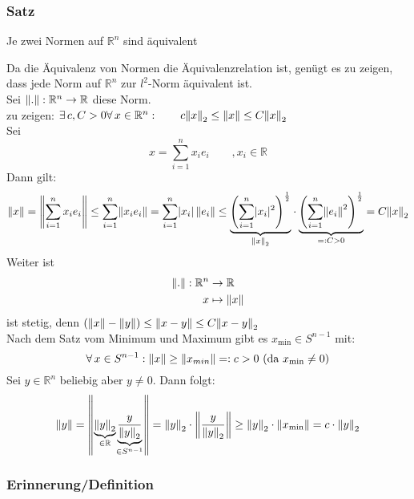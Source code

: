 \subsubsection{Satz} %
\label{ssub:satz}
Je zwei Normen auf $\mathbb{R}^n$ sind äquivalent

Da die Äquivalenz von Normen die Äquivalenzrelation ist, genügt es zu zeigen, dass jede Norm auf $\mathbb{R}^n$ zur $l^2$-Norm äquivalent ist. \\
Sei $\norm{.}:\mathbb{R}^n \to  \mathbb{R}$ diese Norm. \\
zu zeigen: $\exists\, c,C>0 \forall\, x \in \mathbb{R}^n: \qquad c \norm{x}_2 \leq \norm{x} \leq C \norm{x}_2$ \\
Sei \[
	x = \sum^{n}_{i=1}x_ie_i \qquad , x_i \in \mathbb{R}
\]
Dann gilt:
\[
	\norm{x}= \norm{\sum^{n}_{i=1}x_ie_i} \leq \sum^{n}_{i=1}\norm{x_ie_i} = \sum^{n}_{i=1}\abs{x_i} \, \norm{e_i} 
	\leq \underset{\norm{x}_2}{\underbrace{\left(\sum^{n}_{i=1}\abs{x_i}^2  \right)^{\frac{1}{2}}}} \cdot
	 \underset{=:C >0}{\underbrace{\left(\sum^{n}_{i=1}\norm{e_i}^2  \right)^{\frac{1}{2}}}} = C \norm{x}_2
\]
Weiter ist 
\begin{align*}
	\norm{.}:\mathbb{R}^n &\to  \mathbb{R} \\
	x &\mapsto \norm{x}
\end{align*}
ist stetig, denn $(\norm{x}-\norm{y}) \leq \norm{x-y} \leq C \norm{x-y}_2$ \\
Nach dem Satz vom Minimum und Maximum gibt es $x_{\text{min}} \in S^{n-1}$ mit: 
\[
	\forall\, x \in S^{n-1}: \norm{x} \geq \norm{x_{min}} =: c>0 \text{ (da $x_{\text{min}}\neq 0$)}
\]
Sei $y \in \mathbb{R}^n$ beliebig aber $y \neq 0$. Dann folgt:
\[
	\norm{y}= \norm{\underset{\in \mathbb{R}}{\underbrace{\norm{y}_2}} \underset{\in S^{n-1}}{\underbrace{\frac{y}{\norm{y}_2}}}} = \norm{y}_2 \cdot
	 \norm{\frac{y}{\norm{y}_2}} \geq \norm{y}_2 \cdot \norm{x_{\text{min}}} = c \cdot \norm{y}_2
	\]
	\bewende


\subsubsection{Erinnerung/Definition} %
\label{ssub:erinnerung_definition}


